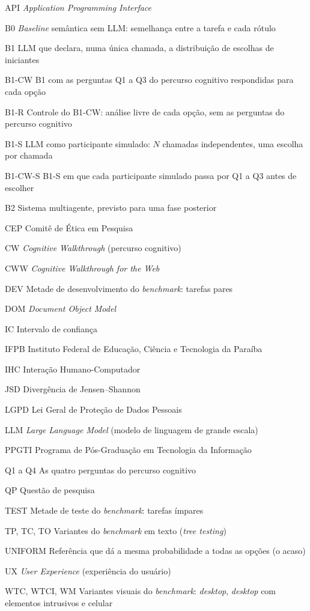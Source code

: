 \documentclass[12pt,oneside,a4paper,chapter=TITLE,english,brazil]{abntex2}
\begin{document}
\begin{siglas}
  \item[API] \textit{Application Programming Interface}
  \item[B0] \textit{Baseline} semântica sem LLM: semelhança entre a tarefa e cada rótulo
  \item[B1] LLM que declara, numa única chamada, a distribuição de escolhas de iniciantes
  \item[B1-CW] B1 com as perguntas Q1 a Q3 do percurso cognitivo respondidas para cada opção
  \item[B1-R] Controle do B1-CW: análise livre de cada opção, sem as perguntas do percurso cognitivo
  \item[B1-S] LLM como participante simulado: $N$ chamadas independentes, uma escolha por chamada
  \item[B1-CW-S] B1-S em que cada participante simulado passa por Q1 a Q3 antes de escolher
  \item[B2] Sistema multiagente, previsto para uma fase posterior
  \item[CEP] Comitê de Ética em Pesquisa
  \item[CW] \textit{Cognitive Walkthrough} (percurso cognitivo)
  \item[CWW] \textit{Cognitive Walkthrough for the Web}
  \item[DEV] Metade de desenvolvimento do \textit{benchmark}: tarefas pares
  \item[DOM] \textit{Document Object Model}
  \item[IC] Intervalo de confiança
  \item[IFPB] Instituto Federal de Educação, Ciência e Tecnologia da Paraíba
  \item[IHC] Interação Humano-Computador
  \item[JSD] Divergência de Jensen--Shannon
  \item[LGPD] Lei Geral de Proteção de Dados Pessoais
  \item[LLM] \textit{Large Language Model} (modelo de linguagem de grande escala)
  \item[PPGTI] Programa de Pós-Graduação em Tecnologia da Informação
  \item[Q1 a Q4] As quatro perguntas do percurso cognitivo
  \item[QP] Questão de pesquisa
  \item[TEST] Metade de teste do \textit{benchmark}: tarefas ímpares
  \item[TP, TC, TO] Variantes do \textit{benchmark} em texto (\textit{tree testing})
  \item[UNIFORM] Referência que dá a mesma probabilidade a todas as opções (o acaso)
  \item[UX] \textit{User Experience} (experiência do usuário)
  \item[WTC, WTCI, WM] Variantes visuais do \textit{benchmark}: \textit{desktop}, \textit{desktop} com elementos intrusivos e celular
\end{siglas}
\end{document}
